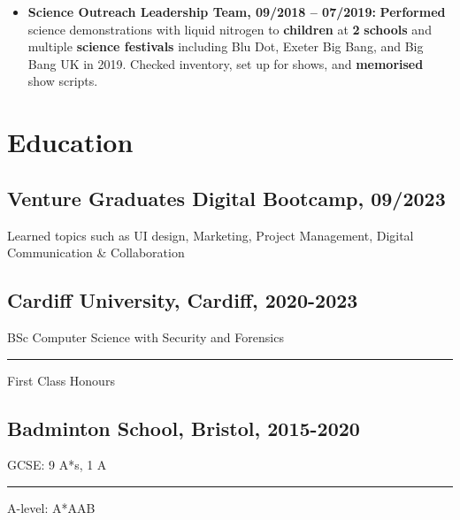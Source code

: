 \documentclass[11pt]{article}
\newcommand{\verticalline}[1][1pt]{\rule[-0.35ex]{#1}{0.9em}}
\begin{document}
\begin{itemize}[itemsep=0pt, leftmargin=1em]
        \item \textbf{Science Outreach Leadership Team, 09/2018 – 07/2019:} \textbf{Performed} science demonstrations with liquid nitrogen to \textbf{children} at \textbf{2} \textbf{schools} and multiple \textbf{science festivals} including Blu Dot, Exeter Big Bang, and Big Bang UK in 2019. Checked inventory, set up for shows, and \textbf{memorised} show scripts.
    \end{itemize}
    

    \section{Education}
    \subsection{Venture Graduates Digital Bootcamp, 09/2023}Learned topics such as UI design, Marketing, Project Management, Digital Communication \& Collaboration 
    \subsection{Cardiff University, Cardiff, 2020-2023} 
    BSc Computer Science with Security and Forensics  \verticalline{} First Class Honours
    \subsection{Badminton School, Bristol, 2015-2020}
    GCSE: 9 A*s, 1 A \verticalline{} A-level: A*AAB
\end{document}
